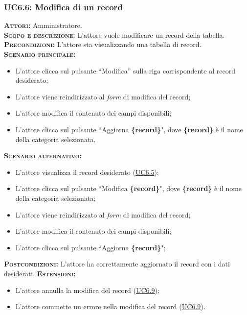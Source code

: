 \subsubsection{UC6.6: Modifica di un record}
\label{sec:UC66}
\textsc{\textbf{Attori:}} Amministratore.\\
\textsc{\textbf{Scopo e descrizione:}} L'attore vuole modificare un record della tabella.\\
\textsc{\textsc{\textbf{Precondizioni:}}} L'attore sta visualizzando una tabella di record.\\
\textsc{\textbf{Scenario principale:}}
\begin{itemize}
    \item L'attore clicca sul pulsante ``Modifica'' sulla riga corrispondente al record desiderato;
    \item L'attore viene reindirizzato al \textit{form} di modifica del record;
    \item L'attore modifica il contenuto dei campi disponibili;
    \item L'attore clicca sul pulsante ``Aggiorna \textbf{\{record\}}", dove \textbf{\{record\}} è il nome della categoria selezionata.
\end{itemize}
\textsc{\textbf{Scenario alternativo:}}
\begin{itemize}
    \item L'attore visualizza il record desiderato (\hyperref[sec:UC65]{UC6.5});
    \item L'attore clicca sul pulsante ``Modifica \textbf{\{record\}}", dove \textbf{\{record\}} è il nome della categoria selezionata;
    \item L'attore viene reindirizzato al \textit{form} di modifica del record;
    \item L'attore modifica il contenuto dei campi disponibili;
    \item L'attore clicca sul pulsante ``Aggiorna \textbf{\{record\}}";
\end{itemize}
\textsc{\textbf{Postcondizioni:}} L'attore ha correttamente aggiornato il record con i dati desiderati.
\textsc{\textbf{Estensioni:}} \begin{itemize}
    \item L'attore annulla la modifica del record (\hyperref[sec:UC69]{UC6.9});
    \item L'attore commette un errore nella modifica del record (\hyperref[sec:UC69]{UC6.9}).
\end{itemize}

